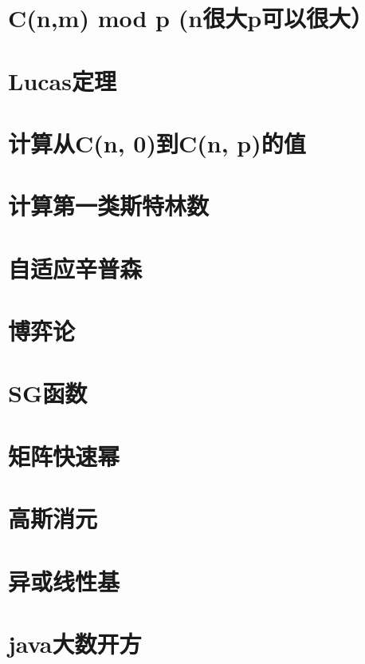 \section{C(n,m) mod p (n很大p可以很大）}
\raggedbottom
\hrulefill
\section{Lucas定理}
\raggedbottom
\hrulefill
\section{计算从C(n, 0)到C(n, p)的值}
\raggedbottom
\hrulefill
\section{计算第一类斯特林数}
\raggedbottom
\hrulefill
\section{自适应辛普森}
\raggedbottom
\hrulefill
\section{博弈论}
\raggedbottom
\hrulefill
\section{SG函数}
\raggedbottom
\hrulefill
\section{矩阵快速幂}
\raggedbottom
\hrulefill
\section{高斯消元}
\raggedbottom
\hrulefill
\section{异或线性基}
\raggedbottom
\hrulefill
\section{java大数开方}
\raggedbottom
\hrulefill
